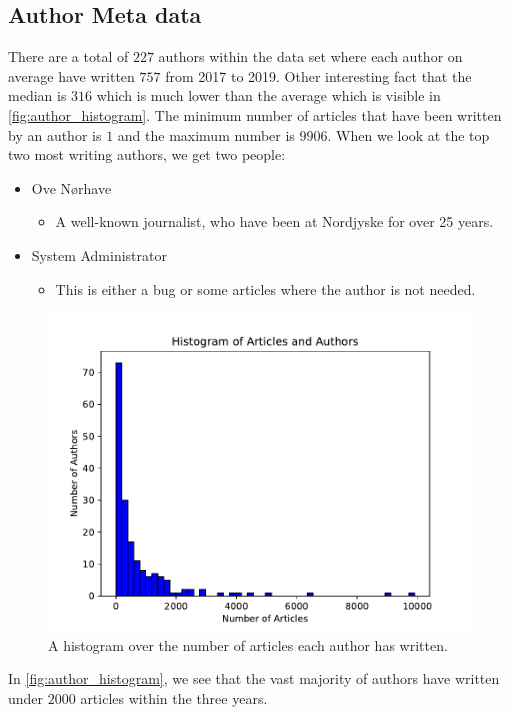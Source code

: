 \subsection{Author Meta data}
There are a total of $227$ authors within the data set where each author on average have written $757$ from 2017 to 2019.
Other interesting fact that the median is $316$ which is much lower than the average which is visible in \autoref{fig:author_histogram}.
The minimum number of articles that have been written by an author is $1$ and the maximum number is $9906$.
When we look at the top two most writing authors, we get two people:
\begin{itemize}
	\item Ove Nørhave
	\begin{itemize}
		\item A well-known journalist, who have been at Nordjyske for over 25 years.
	\end{itemize}
	\item System Administrator
	\begin{itemize}
		\item This is either a bug or some articles where the author is not needed.
	\end{itemize}
\end{itemize}

 
\begin{figure}
	\centering
	\includegraphics[width=\linewidth]{figures/author_hist_plot.pdf}
	\caption{A histogram over the number of articles each author has written.}
	\label{fig:author_histogram}
\end{figure}
In \autoref{fig:author_histogram}, we see that the vast majority of authors have written under $2000$ articles within the three years. 
